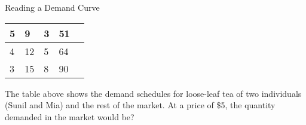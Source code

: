 \documentclass{beamer}
\begin{document}
\begin{frame}[t]{Reading a Demand Curve}
\begin{table}[]
\begin{tabular}{|l|l|l|l|l|}
    5                                                                                 & 9                                                                          & 3                                                                        & 51                                                                                &                                                                           \\ \hline
    4                                                                                 & 12                                                                         & 5                                                                        & 64                                                                                &                                                                           \\ \hline
    3                                                                                 & 15                                                                         & 8                                                                        & 90                                                                                &                                                                           \\ \hline
    \end{tabular}
    \end{table}
    The table above shows the demand schedules for loose-leaf tea of two individuals (Sunil and Mia) and the rest of the market. At a price of \$5, the quantity demanded in the market would be?
\end{frame}
\end{document}
